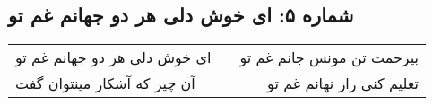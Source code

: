 \begin{center}
\section*{شماره ۵: ای خوش دلی هر دو جهانم غم تو}
\label{sec:005}
\begin{longtable}{l p{0.5cm} r}
ای خوش دلی هر دو جهانم غم تو
&&
بیزحمت تن مونس جانم غم تو
\\
آن چیز که آشکار مینتوان گفت
&&
تعلیم کنی راز نهانم غم تو
\\
\end{longtable}
\end{center}
